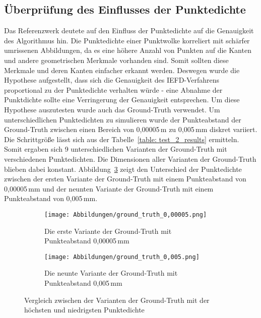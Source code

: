 \subsection{Überprüfung des Einflusses der Punktedichte} \label{test_2}
Das Referenzwerk \autocite{ni_edge_2016} deutete auf den Einfluss der Punktedichte auf die Genauigkeit des Algorithmus hin. Die Punktedichte einer Punktwolke korreliert mit schärfer umrissenen Abbildungen, da es eine höhere Anzahl von Punkten auf die Kanten und andere geometrischen Merkmale vorhanden sind. Somit sollten diese Merkmale und deren Kanten einfacher erkannt werden. Deswegen wurde die Hypothese aufgestellt, dass sich die Genauigkeit des IEFD-Verfahrens proportional zu der Punktedichte verhalten würde - eine Abnahme der Punktdichte sollte eine Verringerung der Genauigkeit entsprechen. Um diese Hypothese auszutesten wurde auch das Ground-Truth verwendet. Um unterschiedlichen Punktedichten zu simulieren wurde der Punkteabstand der Ground-Truth zwischen einen Bereich von 0,00005\,\si{\m} zu 0,005\,\si{\m}m diskret variiert. Die Schrittgröße lässt sich aus der Tabelle~\ref{table: test_2_results} ermitteln. Somit ergaben sich 9 unterschiedlichen Varianten der Ground-Truth mit verschiedenen Punktedichten. Die Dimensionen aller Varianten der Ground-Truth blieben dabei konstant. Abbildung~\ref{fig: testdata_pointdensity_comparision} zeigt den Unterschied der Punktedichte zwischen der ersten Variante der Ground-Truth mit einem Punkteabstand von 0,00005\,\si{\m}m und der neunten Variante der Ground-Truth mit einem Punkteabstand von 0,005\,\si{\m}m.

\begin{figure}[h]
	\centering
	\begin{subfigure}{0.49\textwidth}
		\texttt{[image: Abbildungen/ground\_truth\_0,00005.png]}
		\centering
		\caption[Ground-Truth mit Punkteabstand von 0,00005\,\si{\m}]{Die erste Variante der Ground-Truth mit Punkteabstand 0,00005\,\si{\m}m}
		\label{fig: testdata_0,00005m}
	\end{subfigure}
	\hfill
	\begin{subfigure}{0.49\textwidth}
		\texttt{[image: Abbildungen/ground\_truth\_0,005.png]}
		\centering
		\caption[Ground-Truth mit Punkteabstand von 0,005\,\si{\m}m]{Die neunte Variante der Ground-Truth mit Punkteabstand 0,005\,\si{\m}m}
		\label{fig: testdata_0,005m}
	\end{subfigure}
	\caption[Unterschiedliche Punktedichten der Ground-Truth Datei]{Vergleich zwischen der Varianten der Ground-Truth mit der höchsten und niedrigsten Punktedichte}
	\label{fig: testdata_pointdensity_comparision}
\end{figure}

